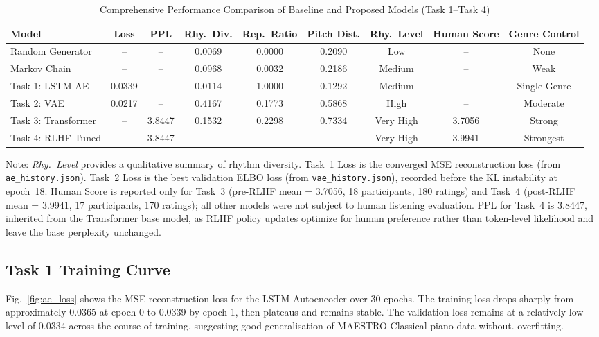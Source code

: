 \documentclass[conference]{IEEEtran}
\begin{document}
\begin{table}[htbp]
\caption{Comprehensive Performance Comparison of Baseline and Proposed Models (Task 1--Task 4)}
\begin{center}
\begin{tabular}{|l|c|c|c|c|c|c|c|c|}
\hline
\textbf{Model} & \textbf{Loss} & \textbf{PPL} & \textbf{Rhy.\ Div.} & \textbf{Rep.\ Ratio} & \textbf{Pitch Dist.} & \textbf{Rhy.\ Level} & \textbf{Human Score} & \textbf{Genre Control} \\
\hline
Random Generator    & --     & --     & 0.0069 & 0.0000 & 0.2090 & Low       & --     & None         \\
Markov Chain        & --     & --     & 0.0968 & 0.0032 & 0.2186 & Medium    & --     & Weak         \\
Task 1: LSTM AE     & 0.0339 & --     & 0.0114 & 1.0000 & 0.1292 & Medium    & --     & Single Genre \\
Task 2: VAE         & 0.0217 & --     & 0.4167 & 0.1773 & 0.5868 & High      & --     & Moderate     \\
Task 3: Transformer & --     & 3.8447 & 0.1532 & 0.2298 & 0.7334 & Very High & 3.7056 & Strong       \\
Task 4: RLHF-Tuned  & --     & 3.8447 & --     & --     & --     & Very High & 3.9941 & Strongest    \\
\hline
\end{tabular}
\label{tab:results}
\end{center}
\noindent\small Note: \textit{Rhy.\ Level} provides a qualitative summary of rhythm diversity.
Task~1 Loss is the converged MSE reconstruction loss (from \texttt{ae\_history.json}).
Task~2 Loss is the best validation ELBO loss (from \texttt{vae\_history.json}), recorded before the KL instability at epoch~18.
Human Score is reported only for Task~3 (pre-RLHF mean = 3.7056, 18 participants, 180 ratings) and Task~4
(post-RLHF mean = 3.9941, 17 participants, 170 ratings); all other models were not subject to human listening evaluation.
PPL for Task~4 is 3.8447, inherited from the Transformer base model, as RLHF policy updates optimize for human
preference rather than token-level likelihood and leave the base perplexity unchanged.
\end{table}

\subsection{Task 1 Training Curve}

Fig.~\ref{fig:ae_loss} shows the MSE reconstruction loss for the LSTM
Autoencoder over 30 epochs. The training loss drops sharply from approximately
0.0365 at epoch 0 to 0.0339 by epoch 1, then plateaus and remains stable. The
validation loss remains at a relatively low level of 0.0334 across the course of training,
suggesting good generalisation of MAESTRO Classical piano data without.
overfitting.
\end{document}
